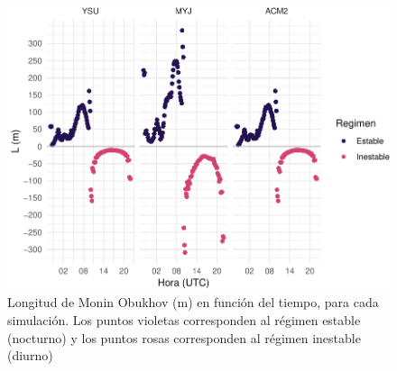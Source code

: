\documentclass[12pt,spanish,oneside, a4paper]{book}
\begin{document}
\begin{figure}

{\centering \includegraphics{00_Paper_files/figure-latex/L-parm-1} 

}

\caption{Longitud de Monin Obukhov (m) en función del tiempo, para cada simulación. Los puntos violetas corresponden al régimen estable (nocturno) y los puntos rosas corresponden al régimen inestable (diurno) \label{L-param}}\label{fig:L-parm}
\end{figure}
\end{document}
